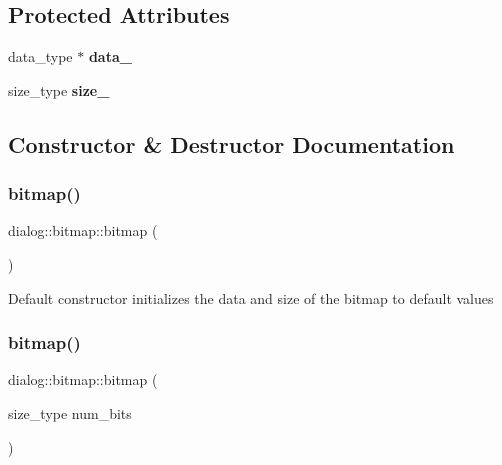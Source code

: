 \subsection*{Protected Attributes}
\begin{DoxyCompactItemize}
\item 
\mbox{\label{classdialog_1_1bitmap_a343e756ef501f484742f1e87a4085074}} 
data\+\_\+type $\ast$ {\bfseries data\+\_\+}
\item 
\mbox{\label{classdialog_1_1bitmap_a85885c54fdd3eec34785d882bc4d3228}} 
size\+\_\+type {\bfseries size\+\_\+}
\end{DoxyCompactItemize}


\subsection{Constructor \& Destructor Documentation}
\mbox{\label{classdialog_1_1bitmap_ab1f8ca9bf43679bbe7a60565d24fdbed}} 
\subsubsection{\texorpdfstring{bitmap()}{bitmap()}\hspace{0.1cm}{\footnotesize\ttfamily [1/2]}}
{\footnotesize\ttfamily dialog\+::bitmap\+::bitmap (\begin{DoxyParamCaption}{ }\end{DoxyParamCaption})\hspace{0.3cm}{\ttfamily [inline]}}

Default constructor initializes the data and size of the bitmap to default values \mbox{\label{classdialog_1_1bitmap_a24d0f574de691d0a6a49042250b70402}} 
\subsubsection{\texorpdfstring{bitmap()}{bitmap()}\hspace{0.1cm}{\footnotesize\ttfamily [2/2]}}
{\footnotesize\ttfamily dialog\+::bitmap\+::bitmap (\begin{DoxyParamCaption}\item[{size\+\_\+type}]{num\+\_\+bits }\end{DoxyParamCaption})\hspace{0.3cm}{\ttfamily [inline]}}


